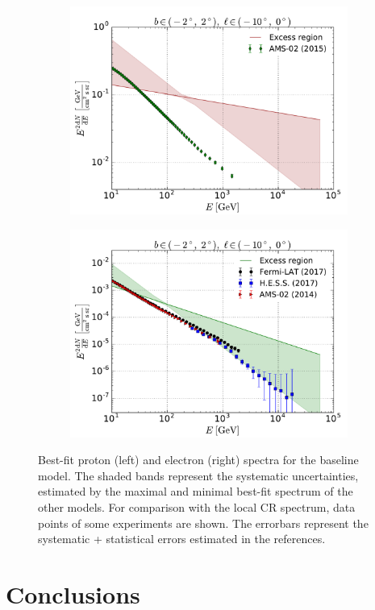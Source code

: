 \begin{figure}[h]
    \begin{subfigure}{0.5\textwidth}
        \includegraphics[width=\textwidth]{plots/Summary_proton_spectra_0.pdf}
    \end{subfigure} 
    \begin{subfigure}{0.5\textwidth}
        \includegraphics[width=\textwidth]{plots/Summary_electron_spectra_0.pdf}
    \end{subfigure}
  	\caption{Best-fit proton (left) and electron (right) spectra for the baseline model. The shaded bands represent the systematic uncertainties, estimated by the maximal and minimal best-fit spectrum of the other models. For comparison with the local CR spectrum, data points of some experiments are shown. The errorbars represent the systematic + statistical errors estimated in the references.}
  	\label{fig:Particle_spectra}
\end{figure}


\section{Conclusions}